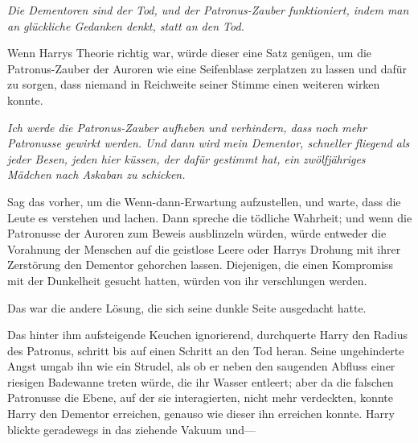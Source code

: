 \emph{Die Dementoren sind der Tod, und der Patronus-Zauber funktioniert, indem man an glückliche Gedanken denkt, statt an den Tod.}

Wenn Harrys Theorie richtig war, würde dieser eine Satz genügen, um die Patronus-Zauber der Auroren wie eine Seifenblase zerplatzen zu lassen und dafür zu sorgen, dass niemand in Reichweite seiner Stimme einen weiteren wirken konnte.

\emph{Ich werde die Patronus-Zauber aufheben und verhindern, dass noch mehr Patronusse gewirkt werden. Und dann wird mein Dementor, schneller fliegend als jeder Besen, jeden hier küssen, der dafür gestimmt hat, ein zwölfjähriges Mädchen nach Askaban zu schicken.}

Sag das vorher, um die Wenn-dann-Erwartung aufzustellen, und warte, dass die Leute es verstehen und lachen. Dann spreche die tödliche Wahrheit; und wenn die Patronusse der Auroren zum Beweis ausblinzeln würden, würde entweder die Vorahnung der Menschen auf die geistlose Leere oder Harrys Drohung mit ihrer Zerstörung den Dementor gehorchen lassen.
Diejenigen, die einen Kompromiss mit der Dunkelheit gesucht hatten, würden von ihr verschlungen werden.

Das war die andere Lösung, die sich seine dunkle Seite ausgedacht hatte.

Das hinter ihm aufsteigende Keuchen ignorierend, durchquerte Harry den Radius des Patronus, schritt bis auf einen Schritt an den Tod heran. Seine ungehinderte Angst umgab ihn wie ein Strudel, als ob er neben den saugenden Abfluss einer riesigen Badewanne treten würde, die ihr Wasser entleert; aber da die falschen Patronusse die Ebene, auf der sie interagierten, nicht mehr verdeckten, konnte Harry den Dementor erreichen, genauso wie dieser ihn erreichen konnte. Harry blickte geradewegs in das ziehende Vakuum und—

